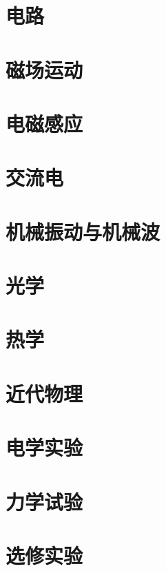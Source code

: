 \documentclass[12pt,UTF-8]{UtopiaPhyCyclus_book}
\begin{document}
\chapter{电路}


\chapter{磁场运动}


\chapter{电磁感应}


\chapter{交流电}


\chapter{机械振动与机械波}


\chapter{光学}


\chapter{热学}


\chapter{近代物理}


\chapter{电学实验}


\chapter{力学试验}


\chapter{选修实验}

\end{document}
